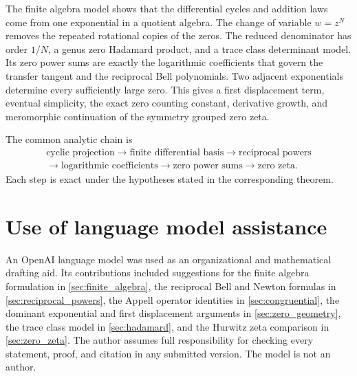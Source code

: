\documentclass{aomart}
\theoremstyle{definition}
\theoremstyle{remark}
\begin{document}
The finite algebra model shows that the differential cycles and addition laws come from one exponential in a quotient algebra.  The change of variable $w=z^N$ removes the repeated rotational copies of the zeros.  The reduced denominator has order $1/N$, a genus zero Hadamard product, and a trace class determinant model.  Its zero power sums are exactly the logarithmic coefficients that govern the transfer tangent and the reciprocal Bell polynomials.  Two adjacent exponentials determine every sufficiently large zero.  This gives a first displacement term, eventual simplicity, the exact zero counting constant, derivative growth, and meromorphic continuation of the symmetry grouped zero zeta.

The common analytic chain is
\[
\begin{gathered}
\text{cyclic projection}
\longrightarrow
\text{finite differential basis}
\longrightarrow
\text{reciprocal powers}
\\
\longrightarrow
\text{logarithmic coefficients}
\longrightarrow
\text{zero power sums}
\longrightarrow
\text{zero zeta}.
\end{gathered}
\]
Each step is exact under the hypotheses stated in the corresponding theorem.

\section*{Use of language model assistance}
An OpenAI language model was used as an organizational and mathematical drafting aid.  Its contributions included suggestions for the finite algebra formulation in \cref{sec:finite_algebra}, the reciprocal Bell and Newton formulas in \cref{sec:reciprocal_powers}, the Appell operator identities in \cref{sec:congruential}, the dominant exponential and first displacement arguments in \cref{sec:zero_geometry}, the trace class model in \cref{sec:hadamard}, and the Hurwitz zeta comparison in \cref{sec:zero_zeta}.  The author assumes full responsibility for checking every statement, proof, and citation in any submitted version.  The model is not an author.



\end{document}
